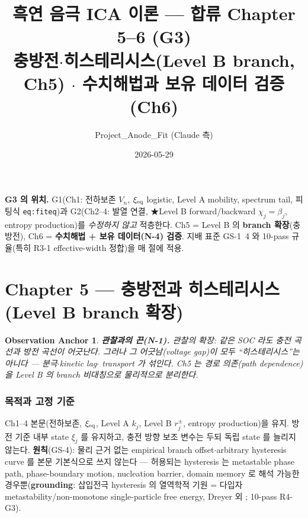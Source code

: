 \documentclass[11pt,a4paper]{article}
\title{\textbf{흑연 음극 ICA 이론 — 합류 Chapter 5--6 (G3)}\\[0.3em]
\large 충방전$\cdot$히스테리시스(Level B branch, Ch5) $\cdot$ 수치해법과 보유 데이터 검증(Ch6)}
\author{Project\_Anode\_Fit (Claude 측)}\date{2026-05-29}
\newtheorem*{anchorbox}{Observation Anchor}
\begin{document}
\maketitle

\begin{mdframed}
\textbf{G3 의 위치.} G1(Ch1: 전하보존 $V_n$, $\xi_{\mathrm{eq}}$ logistic, Level A mobility, spectrum tail,
피팅식 \texttt{eq:fiteq})과 G2(Ch2--4: 발열 연결, ★Level B forward/backward $\chi_j=\beta_j$,
entropy production)를 \emph{수정하지 않고} 적층한다. Ch5 = Level B 의 \textbf{branch 확장}(충방전),
Ch6 = \textbf{수치해법 + 보유 데이터(N-4) 검증}. 지배 표준 GS-1~4 와 10-pass 규율(특히 R3-1
effective-width 정합)을 매 절에 적용.
\end{mdframed}
\tableofcontents
\newpage

\part*{Chapter 5 — 충방전과 히스테리시스 (Level B branch 확장)}
\setcounter{section}{0}

\begin{anchorbox}
\textbf{관찰과의 끈(N-1).} 관찰의 확장: 같은 SOC 라도 \emph{충전 곡선과 방전 곡선이 어긋난다}.
그러나 그 어긋남(voltage gap)이 모두 ``히스테리시스''는 아니다 — 분극$\cdot$kinetic lag$\cdot$
transport 가 섞인다. Ch5 는 \emph{경로 의존(path dependence)}을 Level B 의 branch 비대칭으로
물리적으로 분리한다.
\end{anchorbox}

\section{목적과 고정 기준}\label{sec:ch5_scope}
Ch1--4 본문(전하보존, $\xi_{\mathrm{eq}}$, Level A $k_j$, Level B $r_j^\pm$, entropy production)을 유지.
방전 기준 내부 state $\xi_j$ 를 유지하고, 충전 방향 보조 변수는 두되 독립 state 를 늘리지 않는다.
\textbf{원칙}(GS-4): 물리 근거 없는 empirical branch offset$\cdot$arbitrary hysteresis curve 를 본문
기본식으로 쓰지 않는다 — 허용되는 hysteresis 는 metastable phase path, phase-boundary motion,
nucleation barrier, domain memory 로 해석 가능한 경우뿐(\textbf{grounding}: 삽입전극 hysteresis 의
열역학적 기원 = 다입자 metastability/non-monotone single-particle free energy, Dreyer 외
\cite{dreyer2010}; 10-pass R4-G3).
\end{document}
